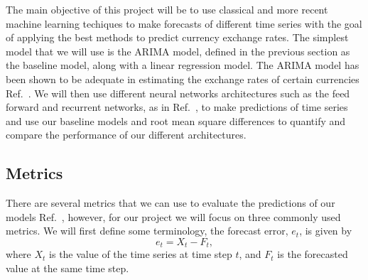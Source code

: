 \documentclass[10pt,a4paper]{article}
\begin{document}
The main objective of this project will be to use classical and more recent machine learning techiques to make forecasts of different time series with the goal of applying the best methods to predict currency exchange rates. The simplest model that we will use is the ARIMA model, defined in the previous section as the baseline model, along with a linear regression model. The ARIMA model has been shown to be adequate in estimating the exchange rates of certain currencies Ref.~\cite{Mong_2016}. We will then use different neural networks architectures such as the feed forward and recurrent networks, as in Ref.~\cite{Chaudhuri_2016,Oancea_2014,Pant_2018}, to make predictions of time series and use our baseline models and root mean square differences to quantify and compare the performance of our different architectures.


\subsection{Metrics}
%


There are several metrics that we can use to evaluate the predictions of our models Ref.~\cite{Adhikari_2013}, however, for our project we will focus on three commonly used metrics. We will first define some terminology, the forecast error, $e_t$, is given by
\begin{equation}
e_{t} = X_t - F_t,
\end{equation}
where $X_t$ is the value of the time series at time step $t$, and $F_t$ is the forecasted value at the same time step.
\end{document}
